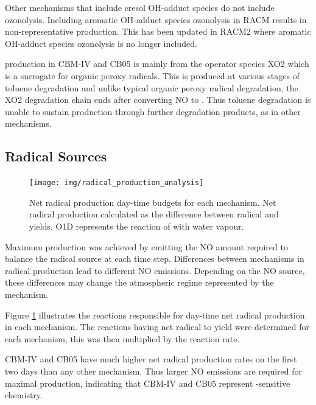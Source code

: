 Other mechanisms that include cresol OH-adduct species do not include ozonolysis.
Including aromatic OH-adduct species ozonolysis in RACM results in non-representative  production. 
This has been updated in RACM2 where aromatic OH-adduct species ozonolysis is no longer included.

 production in CBM-IV and CB05 is mainly from the operator species XO2 which is a surrogate for organic peroxy radicals.
This is produced at various stages of toluene degradation and unlike typical organic peroxy radical degradation, the XO2 degradation chain ends after converting NO to .
Thus toluene degradation is unable to sustain  production through further degradation products, as in other mechanisms.

\subsection{Radical Sources} \label{ss:radicals}

\begin{figure}
    \centering
    \texttt{[image: img/radical\_production\_analysis]}
    \vspace{0mm}
    \caption{Net radical production day-time budgets for each mechanism. Net radical production calculated as the difference between radical and  yields. O1D represents the reaction of  with water vapour.}
    \vspace{-4mm}
    \label{f:radical_production} 
\end{figure} 

Maximum  production was achieved by emitting the NO amount required to balance the radical source at each time step. 
Differences between mechanisms in radical production lead to different NO emissions.
Depending on the NO source, these differences may change the atmospheric regime represented by the mechanism.

Figure \ref{f:radical_production} illustrates the reactions responsible for day-time net radical production in each mechanism.
The reactions having net radical to  yield were determined for each mechanism, this was then multiplied by the reaction rate.

CBM-IV and CB05 have much higher net radical production rates on the first two days than any other mechanism.
Thus larger NO emissions are required for maximal  production, indicating that CBM-IV and CB05 represent -sensitive chemistry.

